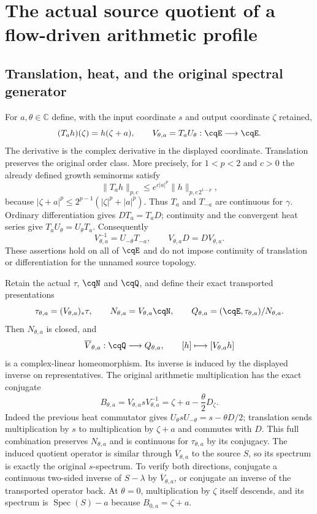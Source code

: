 \section{The actual source quotient of a flow-driven arithmetic profile}
\label{sec:cq-flow-source-quotient}

\subsection{Translation, heat, and the original spectral generator}

For $a,\theta\in\mathbb C$ define, with the input coordinate $s$ and
output coordinate $\zeta$ retained,
\[
 (T_ah)(\zeta)=h(\zeta+a),\qquad
 V_{\theta,a}=T_aU_\theta:\cqE\longrightarrow\cqE.
\]
The derivative is the complex derivative in the displayed coordinate.
Translation preserves the original order class. More precisely, for
$1<p<2$ and $c>0$ the already defined growth seminorms satisfy
\[
 \|T_ah\|_{p,c}\leq
 e^{c|a|^p}\|h\|_{p,c\,2^{1-p}},
\]
because $|\zeta+a|^p\leq2^{p-1}(|\zeta|^p+|a|^p)$.
Thus $T_a$ and $T_{-a}$ are continuous for $\gamma$. Ordinary
differentiation gives $DT_a=T_aD$; continuity and the convergent
heat series give $T_aU_\theta=U_\theta T_a$. Consequently
\[
 V_{\theta,a}^{-1}=U_{-\theta}T_{-a},\qquad
 V_{\theta,a}D=DV_{\theta,a}.
\]
These assertions hold on all of $\cqE$ and do not impose continuity
of translation or differentiation for the unnamed source topology.

Retain the actual $\tau$, $\cqN$ and $\cqQ$, and define their exact
transported presentations
\begin{equation}
 \tau_{\theta,a}=(V_{\theta,a})_*\tau,\qquad
 N_{\theta,a}=V_{\theta,a}\cqN,\qquad
 Q_{\theta,a}=(\cqE,\tau_{\theta,a})/N_{\theta,a}.
 \label{eq:cq-flow-moving-source}
\end{equation}
Then $N_{\theta,a}$ is closed, and
\[
 \overline V_{\theta,a}:\cqQ\longrightarrow Q_{\theta,a},
 \qquad[h]\longmapsto[V_{\theta,a}h]
\]
is a complex-linear homeomorphism. Its inverse is induced by the
displayed inverse on representatives. The original arithmetic
multiplication has the exact conjugate
\begin{equation}
 B_{\theta,a}=V_{\theta,a}sV_{\theta,a}^{-1}
              =\zeta+a-\frac{\theta}{2}D_\zeta .
 \label{eq:cq-flow-spectral-generator}
\end{equation}
Indeed the previous heat commutator gives
$U_\theta sU_{-\theta}=s-\theta D/2$; translation sends multiplication
by $s$ to multiplication by $\zeta+a$ and commutes with $D$.
This full combination preserves $N_{\theta,a}$ and is continuous for
$\tau_{\theta,a}$ by its conjugacy. The induced quotient operator is
similar through $\overline V_{\theta,a}$ to the source $S$, so its
spectrum is exactly the original $s$-spectrum. To verify both
directions, conjugate a continuous two-sided inverse of $S-\lambda$
by $\overline V_{\theta,a}$, or conjugate an inverse of the transported
operator back. At $\theta=0$, multiplication by $\zeta$ itself
descends, and its spectrum is $\operatorname{Spec}(S)-a$ because
$B_{0,a}=\zeta+a$.

